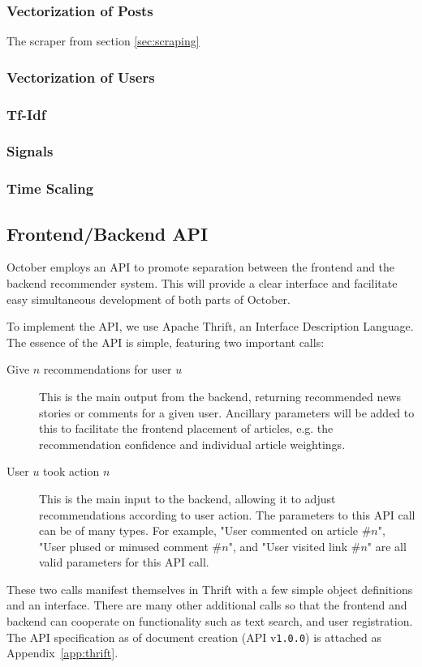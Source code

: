 \documentclass[11pt,letterpaper]{article}
\begin{document}
\subsubsection{Vectorization of Posts}
The scraper from section \ref{sec:scraping}
\subsubsection{Vectorization of Users}
\subsubsection{Tf-Idf}
\subsubsection{Signals}
\subsubsection{Time Scaling}

\subsection{Frontend/Backend API}
\label{sec:api}
October employs an API to promote separation between the frontend and the backend recommender system.
This will provide a clear interface and facilitate easy simultaneous development of both parts of October.

To implement the API, we use Apache Thrift, an Interface Description Language\cite{thrift}.
The essence of the API is simple, featuring two important calls:
\begin{description}
\item[Give $n$ recommendations for user $u$]
This is the main output from the backend, returning recommended news stories or comments for a given user.
Ancillary parameters will be added to this to facilitate the frontend placement of articles, e.g. the recommendation confidence and individual article weightings.
\item[User $u$ took action $n$]
This is the main input to the backend, allowing it to adjust recommendations according to user action.
The parameters to this API call can be of many types. For example, "User commented on article \#$n$", "User plused or minused comment \#$n$", and "User visited link \#$n$" are all valid parameters for this API call.
\end{description}

These two calls manifest themselves in Thrift with a few simple object definitions and an interface.
There are many other additional calls so that the frontend and backend can cooperate on functionality such as text search, and user registration.
The API specification as of document creation (API v\texttt{1.0.0}) is attached as Appendix~\ref{app:thrift}.
\end{document}
